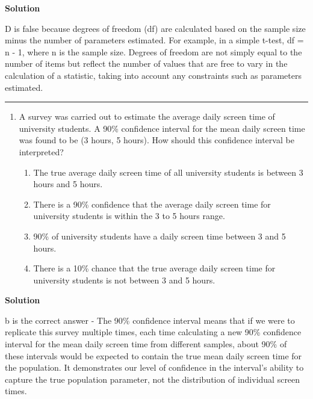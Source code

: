 \documentclass[
  letterpaper,
  DIV=11,
  numbers=noendperiod,
  oneside]{scrreprt}
\providecommand{\tightlist}{%
  \setlength{\itemsep}{0pt}\setlength{\parskip}{0pt}}\usepackage{longtable,booktabs,array}
\begin{document}
\textbf{Solution}

D is false because degrees of freedom (df) are calculated based on the
sample size minus the number of parameters estimated. For example, in a
simple t-test, df = n - 1, where n is the sample size. Degrees of
freedom are not simply equal to the number of items but reflect the
number of values that are free to vary in the calculation of a
statistic, taking into account any constraints such as parameters
estimated.

\begin{center}\rule{0.5\linewidth}{0.5pt}\end{center}

\begin{enumerate}
\def\labelenumi{\arabic{enumi}.}
\setcounter{enumi}{1}
\tightlist
\item
  A survey was carried out to estimate the average daily screen time of
  university students. A 90\% confidence interval for the mean daily
  screen time was found to be (3 hours, 5 hours). How should this
  confidence interval be interpreted?

  \begin{enumerate}
  \def\labelenumii{\alph{enumii}.}
  \tightlist
  \item
    The true average daily screen time of all university students is
    between 3 hours and 5 hours.
  \item
    There is a 90\% confidence that the average daily screen time for
    university students is within the 3 to 5 hours range.
  \item
    90\% of university students have a daily screen time between 3 and 5
    hours.
  \item
    There is a 10\% chance that the true average daily screen time for
    university students is not between 3 and 5 hours.
  \end{enumerate}
\end{enumerate}

\textbf{Solution}

b is the correct answer - The 90\% confidence interval means that if we
were to replicate this survey multiple times, each time calculating a
new 90\% confidence interval for the mean daily screen time from
different samples, about 90\% of these intervals would be expected to
contain the true mean daily screen time for the population. It
demonstrates our level of confidence in the interval's ability to
capture the true population parameter, not the distribution of
individual screen times.
\end{document}
